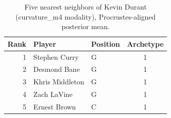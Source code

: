 \begin{table}[htbp]
  \centering\small
  \begin{tabular}{rllc}
    \toprule
    Rank & Player & Position & Archetype \\
    \midrule
    1 & Stephen Curry & G & 1 \\
    2 & Desmond Bane & G & 1 \\
    3 & Khris Middleton & G & 1 \\
    4 & Zach LaVine & G & 1 \\
    5 & Ernest Brown & C & 1 \\
    \bottomrule
  \end{tabular}
  \caption{Five nearest neighbors of Kevin Durant (curvature_m4 modality), Procrustes-aligned posterior mean.}
  \label{tab:Kevin_Durant_neighbors_curvature_m4}
\end{table}

